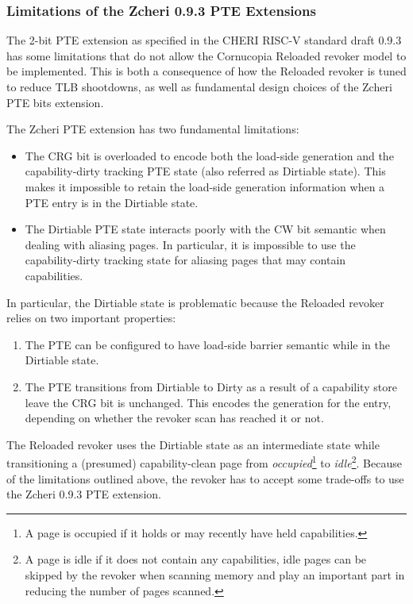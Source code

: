 \subsubsection{Limitations of the Zcheri 0.9.3 PTE Extensions}
The 2-bit PTE extension as specified in the CHERI RISC-V standard draft 0.9.3
has some limitations that do not allow the Cornucopia Reloaded revoker model
to be implemented. This is both a consequence of how the Reloaded revoker is
tuned to reduce TLB shootdowns, as well as fundamental design choices of the
Zcheri PTE bits extension.

The Zcheri PTE extension has two fundamental limitations:
\begin{itemize}
\item The CRG bit is overloaded to encode both the load-side generation and the
  capability-dirty tracking PTE state (also referred as Dirtiable
  state). This makes it impossible to retain the load-side generation
  information when a PTE entry is in the Dirtiable state.
\item The Dirtiable PTE state interacts poorly with the CW bit
  semantic when dealing with aliasing pages. In particular, it is impossible
  to use the capability-dirty tracking state for aliasing pages that may
  contain capabilities.
\end{itemize}

In particular, the Dirtiable state is problematic because the
Reloaded revoker relies on two important properties:
\begin{enumerate}
  \item The PTE can be configured to have load-side barrier semantic while in
    the Dirtiable state.
  \item The PTE transitions from Dirtiable to Dirty as a
    result of a capability store leave the CRG bit is unchanged. This
    encodes the generation for the entry, depending on whether the
    revoker scan has reached it or not.
\end{enumerate}

The Reloaded revoker uses the Dirtiable state as an intermediate state
while transitioning a (presumed) capability-clean page from
\textit{occupied}\footnote{A page is occupied if it holds or may recently have
held capabilities.} to \textit{idle}\footnote{A page is idle if it does not
contain any capabilities, idle pages can be skipped by the revoker when scanning
memory and play an important part in reducing the number of pages scanned.}.
Because of the limitations outlined above, the revoker has to accept some
trade-offs to use the Zcheri 0.9.3 PTE extension.

